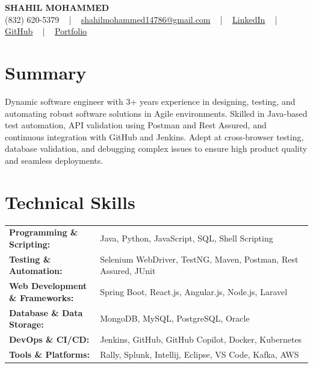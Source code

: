 \documentclass[letterpaper,11pt]{article}
\begin{document}
\begin{center}
    {\fontsize{14pt}{12pt}\selectfont \textbf{\MakeUppercase{Shahil Mohammed}}}\\ \vspace{2pt}
    \fontsize{10pt}{12pt}\selectfont (832) 620-5379 ~ | ~ \href{mailto:shahilmohammed14786@gmail.com}{shahilmohammed14786@gmail.com} ~ | ~  
    \href{https://www.linkedin.com/in/shahil-mohammed-9652931a1/}{\color{blue}\underline{LinkedIn}}  ~ | ~ 
    \href{https://github.com/freakbeast14}{\color{blue}\underline{GitHub}} ~ | ~ 
    \href{https://shahil-mohammed.netlify.app/}{\color{blue}\underline{Portfolio}}
    \vspace{-8pt}
\end{center}

\section{Summary}
\fontsize{9pt}{10pt}\selectfont
Dynamic software engineer with 3+ years experience in designing, testing, and automating robust software solutions in Agile environments. Skilled in Java-based test automation, API validation using Postman and Rest Assured, and continuous integration with GitHub and Jenkins. Adept at cross-browser testing, database validation, and debugging complex issues to ensure high product quality and seamless deployments.
 \vspace{-5pt}
 
\section{Technical Skills}
        \vspace{-14pt}
        \begin{table}[h]
            \fontsize{9pt}{10pt}\selectfont
            \begin{tabular}{p{0.3\linewidth} p{0.7\linewidth}}
                \textbf{Programming \& Scripting:} & Java, Python, JavaScript, SQL, Shell Scripting \\
                \textbf{Testing \& Automation:} & Selenium WebDriver, TestNG, Maven, Postman, Rest Assured, JUnit \\
                \textbf{Web Development \& Frameworks:} & Spring Boot, React.js, Angular.js, Node.js, Laravel \\
                \textbf{Database \& Data Storage:} & MongoDB, MySQL, PostgreSQL, Oracle \\
                \textbf{DevOps \& CI/CD:} & Jenkins, GitHub, GitHub Copilot, Docker, Kubernetes \\
                \textbf{Tools \& Platforms:} & Rally, Splunk, Intellij, Eclipse, VS Code, Kafka, AWS \\
            \end{tabular}
        \end{table}
 \vspace{-15pt}
 
\end{document}

